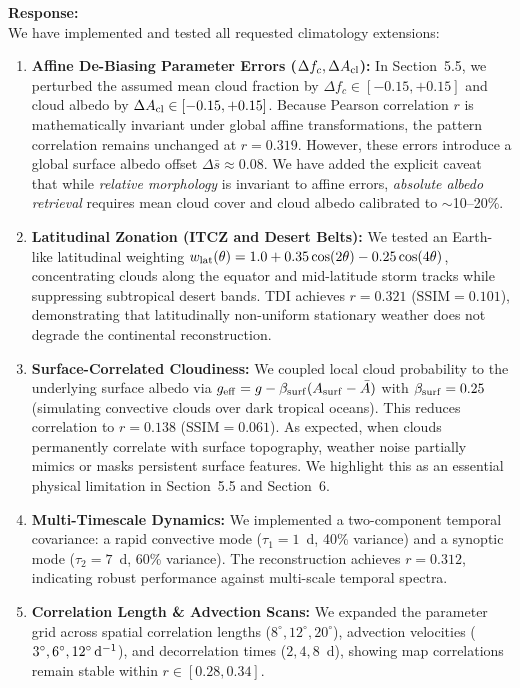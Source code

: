 \documentclass[11pt]{article}
\begin{document}
\textbf{Response:}\\[1mm]
We have implemented and tested all requested climatology extensions:
\begin{enumerate}
\item \textbf{Affine De-Biasing Parameter Errors ($\Delta f_c, \Delta A_{\rm cl}$):} In Section~5.5, we perturbed the assumed mean cloud fraction by $\Delta f_c \in [-0.15, +0.15]$ and cloud albedo by $\Delta A_{\rm cl} \in [-0.15, +0.15]$. Because Pearson correlation $r$ is mathematically invariant under global affine transformations, the pattern correlation remains unchanged at $r=0.319$. However, these errors introduce a global surface albedo offset $\Delta \bar{s} \approx 0.08$. We have added the explicit caveat that while \textit{relative morphology} is invariant to affine errors, \textit{absolute albedo retrieval} requires mean cloud cover and cloud albedo calibrated to $\sim$10--20\%.
\item \textbf{Latitudinal Zonation (ITCZ and Desert Belts):} We tested an Earth-like latitudinal weighting $w_{\rm lat}(\theta) = 1.0 + 0.35\cos(2\theta) - 0.25\cos(4\theta)$, concentrating clouds along the equator and mid-latitude storm tracks while suppressing subtropical desert bands. TDI achieves $r = 0.321$ ($\mathrm{SSIM}=0.101$), demonstrating that latitudinally non-uniform stationary weather does not degrade the continental reconstruction.
\item \textbf{Surface-Correlated Cloudiness:} We coupled local cloud probability to the underlying surface albedo via $g_{\rm eff} = g - \beta_{\rm surf}(A_{\rm surf} - \bar{A})$ with $\beta_{\rm surf}=0.25$ (simulating convective clouds over dark tropical oceans). This reduces correlation to $r = 0.138$ ($\mathrm{SSIM}=0.061$). As expected, when clouds permanently correlate with surface topography, weather noise partially mimics or masks persistent surface features. We highlight this as an essential physical limitation in Section~5.5 and Section~6.
\item \textbf{Multi-Timescale Dynamics:} We implemented a two-component temporal covariance: a rapid convective mode ($\tau_1=1$~d, 40\% variance) and a synoptic mode ($\tau_2=7$~d, 60\% variance). The reconstruction achieves $r = 0.312$, indicating robust performance against multi-scale temporal spectra.
\item \textbf{Correlation Length \& Advection Scans:} We expanded the parameter grid across spatial correlation lengths ($8^\circ, 12^\circ, 20^\circ$), advection velocities ($3^\circ, 6^\circ, 12^\circ\,{\rm d}^{-1}$), and decorrelation times ($2, 4, 8$~d), showing map correlations remain stable within $r \in [0.28, 0.34]$.
\end{enumerate}
\end{document}
